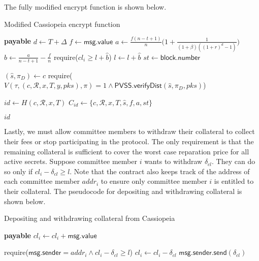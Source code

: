 The fully modified \textsf{encrypt} function is shown below.
\begin{algorithm}[H]
\caption{Modified Cassiopeia \textsf{encrypt} function}
\label{alg:encrypt_incentives}
    \begin{algorithmic}[1]
             \textbf{payable}
                \State $d \gets T + \Delta$
                \State $f \gets \textsf{msg.value}$
                \State $a \gets \frac{f(n - t + 1)}{n}\biggl(1 + \frac{1}{(1 + \beta)((1 + r)^d - 1)}\biggr)$ 
                \State $\hat{b} \gets \frac{a}{n - t + 1} - \frac{f}{n}$ 
                    \State require($cl_i \geq l + \hat{b}$)
                \EndFor
                \State $l \gets l + \hat{b}$
                \State $st \gets \textsf{block.number}$

                \State $(\hat{s}, \pi_D) \gets c$
                \State require($V(\tau, (c, \mathcal{R}, x, T, y, pks), \pi) = 1 \land \textsf{PVSS.verifyDist}(\hat{s}, \pi_D, pks)$)

                \State $id \gets H(c, \mathcal{R}, x, T)$
                \State $C_{id} \gets \{c, \mathcal{R}, x, T, \hat{s}, f, a, st\}$

                \State \Return $id$
            \EndFunction
    \end{algorithmic}
\end{algorithm}

Lastly, we must allow committee members to withdraw their collateral to collect their fees or stop participating in the protocol.
The only requirement is that the remaining collateral is sufficient to cover the worst case reparation price for all active secrets.
Suppose committee member $i$ wants to withdraw $\delta_{cl}$.
They can do so only if $cl_i - \delta_{cl} \geq l$.
Note that the contract also keeps track of the address of each committee member $addr_i$ to ensure only committee member $i$ is entitled to their collateral.
The pseudocode for depositing and withdrawing collateral is shown below.

\begin{algorithm}[H]
\caption{Depositing and withdrawing collateral from Cassiopeia}
    \begin{algorithmic}[1]
         \textbf{payable}
            \State $cl_i \gets cl_i + \textsf{msg.value}$
        \EndFunction

            \State require($\textsf{msg.sender} = addr_i \land cl_i - \delta_{cl} \geq l$)
            \State $cl_i \gets cl_i - \delta_{cl}$
            \State $\textsf{msg.sender.send}(\delta_{cl})$
        \EndFunction
    \end{algorithmic}
\end{algorithm}


